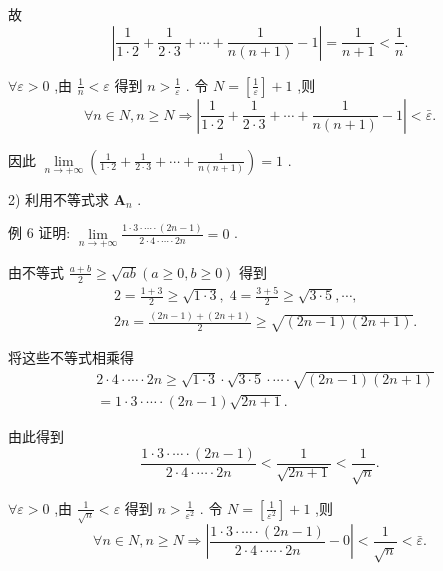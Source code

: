 故
$$\left| {\frac{1}{1 \cdot  2} + \frac{1}{2 \cdot  3} + \cdots  + \frac{1}{n\left( {n + 1}\right) } - 1}\right|  = \frac{1}{n + 1} < \frac{1}{n}.$$

$\forall \varepsilon  > 0$ ,由 $\frac{1}{n} < \varepsilon$ 得到 $n > \frac{1}{\varepsilon }$ . 令 $N = \left\lbrack  \frac{1}{\varepsilon }\right\rbrack   + 1$ ,则
$$\forall n \in  N,n \geq  N \Rightarrow  \left| {\frac{1}{1 \cdot  2} + \frac{1}{2 \cdot  3} + \cdots  + \frac{1}{n\left( {n + 1}\right) } - 1}\right|  < \bar{\varepsilon }.$$

因此 $\mathop{\lim }\limits_{{n \rightarrow   + \infty }}\left( {\frac{1}{1 \cdot  2} + \frac{1}{2 \cdot  3} + \cdots  + \frac{1}{n\left( {n + 1}\right) }}\right)  = 1$ .

2) 利用不等式求 ${\mathbf{A}}_{n}$ .

例 6 证明: $\mathop{\lim }\limits_{{n \rightarrow   + \infty }}\frac{1 \cdot  3 \cdot  \cdots  \cdot  \left( {{2n} - 1}\right) }{2 \cdot  4 \cdot  \cdots  \cdot  {2n}} = 0$ .

由不等式 $\frac{a + b}{2} \geq  \sqrt{ab}\left( {a \geq  0,b \geq  0}\right)$ 得到
\begin{align*}
	&2 = \frac{1 + 3}{2} \geq  \sqrt{1 \cdot  3},\;4 = \frac{3 + 5}{2} \geq  \sqrt{3 \cdot  5},\cdots ,\\
	&{2n} = \frac{\left( {{2n} - 1}\right)  + \left( {{2n} + 1}\right) }{2} \geq  \sqrt{\left( {{2n} - 1}\right) \left( {{2n} + 1}\right) }.
\end{align*}

将这些不等式相乘得
\begin{align*}
	&2 \cdot  4 \cdot  \cdots  \cdot  {2n} \geq  \sqrt{1 \cdot  3} \cdot  \sqrt{3 \cdot  5} \cdot  \cdots  \cdot  \sqrt{\left( {{2n} - 1}\right) \left( {{2n} + 1}\right) }\\
	&= 1 \cdot  3 \cdot  \cdots  \cdot  \left( {{2n} - 1}\right) \sqrt{{2n} + 1}.
\end{align*}

由此得到
$$\frac{1 \cdot  3 \cdot  \cdots  \cdot  \left( {{2n} - 1}\right) }{2 \cdot  4 \cdot  \cdots  \cdot  {2n}} < \frac{1}{\sqrt{{2n} + 1}} < \frac{1}{\sqrt{n}}.$$

$\forall \varepsilon  > 0$ ,由 $\frac{1}{\sqrt{n}} < \varepsilon$ 得到 $n > \frac{1}{{\varepsilon }^{2}}$ . 令 $N = \left\lbrack  \frac{1}{{\varepsilon }^{2}}\right\rbrack   + 1$ ,则
$$\forall n \in  N,n \geq  N \Rightarrow  \left| {\frac{1 \cdot  3 \cdot  \cdots  \cdot  \left( {{2n} - 1}\right) }{2 \cdot  4 \cdot  \cdots  \cdot  {2n}} - 0}\right|  < \frac{1}{\sqrt{n}} < \bar{\varepsilon }.$$

